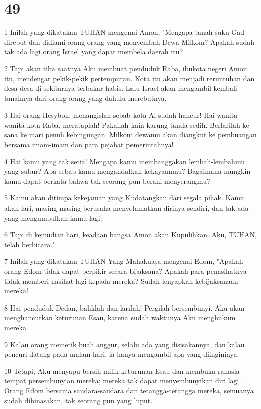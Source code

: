 \chapter{49}

\par 1 Inilah yang dikatakan TUHAN mengenai Amon, "Mengapa tanah suku Gad direbut dan didiami orang-orang yang menyembah Dewa Milkom? Apakah sudah tak ada lagi orang Israel yang dapat membela daerah itu?
\par 2 Tapi akan tiba saatnya Aku membuat penduduk Raba, ibukota negeri Amon itu, mendengar pekik-pekik pertempuran. Kota itu akan menjadi reruntuhan dan desa-desa di sekitarnya terbakar habis. Lalu Israel akan mengambil kembali tanahnya dari orang-orang yang dahulu merebutnya.
\par 3 Hai orang Hesybon, menangislah sebab kota Ai sudah hancur! Hai wanita-wanita kota Raba, merataplah! Pakailah kain karung tanda sedih. Berlarilah ke sana ke mari penuh kebingungan. Milkom dewamu akan diangkut ke pembuangan bersama imam-imam dan para pejabat pemerintahnya!
\par 4 Hai kamu yang tak setia! Mengapa kamu membanggakan lembah-lembahmu yang subur? Apa sebab kamu mengandalkan kekayaanmu? Bagaimana mungkin kamu dapat berkata bahwa tak seorang pun berani menyerangmu?
\par 5 Kamu akan ditimpa kekejaman yang Kudatangkan dari segala pihak. Kamu akan lari, masing-masing berusaha menyelamatkan dirinya sendiri, dan tak ada yang mengumpulkan kamu lagi.
\par 6 Tapi di kemudian hari, keadaan bangsa Amon akan Kupulihkan. Aku, TUHAN, telah berbicara."
\par 7 Inilah yang dikatakan TUHAN Yang Mahakuasa mengenai Edom, "Apakah orang Edom tidak dapat berpikir secara bijaksana? Apakah para penasihatnya tidak memberi nasihat lagi kepada mereka? Sudah lenyapkah kebijaksanaan mereka!
\par 8 Hai penduduk Dedan, baliklah dan larilah! Pergilah bersembunyi. Aku akan menghancurkan keturunan Esau, karena sudah waktunya Aku menghukum mereka.
\par 9 Kalau orang memetik buah anggur, selalu ada yang disisakannya, dan kalau pencuri datang pada malam hari, ia hanya mengambil apa yang diingininya.
\par 10 Tetapi, Aku menyapu bersih milik keturunan Esau dan membuka rahasia tempat persembunyian mereka; mereka tak dapat menyembunyikan diri lagi. Orang Edom bersama saudara-saudara dan tetangga-tetangga mereka, semuanya sudah dibinasakan, tak seorang pun yang luput.
